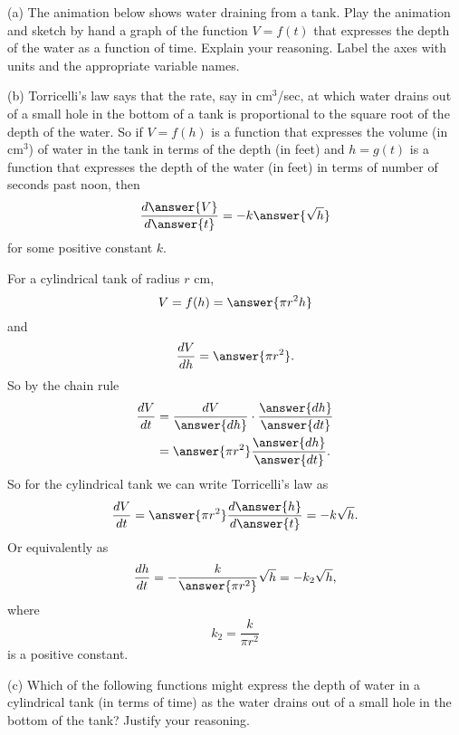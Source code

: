 \documentclass{ximera}
\begin{document}
\begin{question}  \label{Q:dgynnrzaq}
(a) The animation below shows water draining from a tank. Play the animation and sketch by hand a graph of the function $V=f(t)$ that expresses the depth of the water as a function of time. Explain your reasoning. Label the axes with units and the appropriate variable names.


 
\begin{onlineOnly}
    \begin{center}
\end{center}
\end{onlineOnly}

(b) Torricelli's law says that the rate, say in $\text{cm}^3$/sec, at which water drains out of a small hole in the bottom of a tank is proportional to the square root of the depth of the water. So if $V=f(h)$ is a function that expresses the volume (in $\text{cm}^3$) of water in the tank in terms of the depth (in feet) and $h=g(t)$ is a function that expresses the depth of the water (in feet) in terms of number of seconds past noon, then 
\[
    \frac{d{\answer{V}}}{d\answer{t}} = - k \answer{\sqrt{h}} 
\]
for some positive constant $k$.

For a cylindrical tank of radius $r$ cm, 
\[
     V = f(h) = \answer{\pi r^2h} 
\]
and 
\[
    \frac{dV}{dh} = \answer{\pi r^2}.
\]
So by the chain rule
\begin{align*}
 \frac{dV}{dt} &= \frac{dV}{\answer{dh}} \cdot \frac{\answer{dh}}{\answer{dt}} \\
                     &= \answer{\pi r^2} \frac{\answer{dh}}{\answer{dt}} . \\
\end{align*}
So for the cylindrical tank we can write Torricelli's law as
\[
   \frac{dV}{dt} =  \answer{\pi r^2} \frac{d\answer{h}}{d\answer{t}} = - k \sqrt{h} .
\]
Or equivalently as
\[
      \frac{dh}{dt} = - \frac{k}{\answer{\pi r^2}} \sqrt{h} = -k_2 \sqrt{h} ,
\]
where
\[
       k_2= \frac{k}{\pi r^2}
\]
is a positive constant.

(c) Which of the following functions might express the depth of water in a cylindrical tank (in terms of time) as the water drains out of a small hole in the bottom of the tank? Justify your reasoning.


\end{question}
\end{document}
